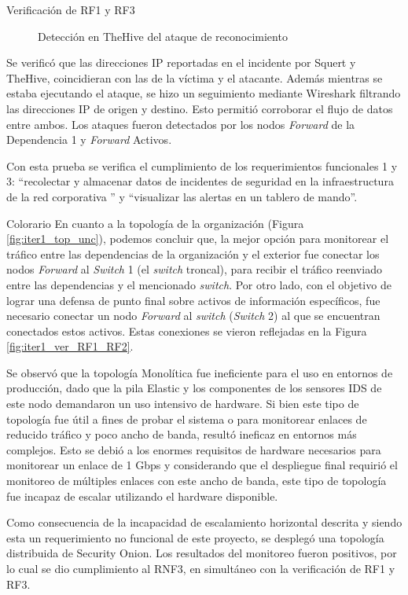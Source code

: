 \begin{section}{Verificación de RF1 y RF3}
\begin{figure}[H]
    \caption{Detección en TheHive del ataque de reconocimiento}
    \label{fig:thehive-nmap}
    \end{figure}
    \FloatBarrier
    Se verificó que las direcciones IP reportadas en el incidente por Squert y TheHive, coincidieran con las de la víctima y el atacante. Además mientras se estaba ejecutando el ataque, se hizo un seguimiento mediante Wireshark \cite{wireshark} filtrando las direcciones IP de origen y destino. Esto permitió corroborar el flujo de datos entre ambos.
    Los ataques fueron detectados por los nodos \textit{Forward} de la Dependencia 1 y \textit{Forward} Activos. \par
    Con esta prueba se verifica el cumplimiento de los requerimientos funcionales 1 y 3: “recolectar y almacenar datos de incidentes de seguridad en la infraestructura de la red corporativa ” y “visualizar las alertas en un tablero de mando”.\par
    \end{section} 
    
    
    \begin{section}{Colorario}
    En cuanto a la topología de la organización (Figura \ref{fig:iter1_top_unc}), podemos concluir que, la mejor opción para monitorear el tráfico entre las dependencias de la organización y el exterior fue conectar los nodos \textit{Forward} al \textit{Switch} 1 (el \textit{switch} troncal), para recibir el tráfico reenviado entre las dependencias y el mencionado \textit{switch}. Por otro lado, con el objetivo de lograr una defensa de punto final sobre activos de información específicos, fue necesario conectar un nodo \textit{Forward} al \textit{switch} (\textit{Switch} 2) al que se encuentran conectados estos activos. Estas conexiones se vieron reflejadas en la Figura \ref{fig:iter1_ver_RF1_RF2}. \par
    Se observó que la topología Monolítica fue ineficiente para el uso en entornos de producción, dado que la pila Elastic y los componentes de los sensores IDS de este nodo demandaron un uso intensivo de hardware. Si bien este tipo de topología fue útil a fines de probar el sistema o para monitorear enlaces de reducido tráfico y poco ancho de banda, resultó ineficaz en entornos más complejos. Esto se debió a los enormes requisitos de hardware necesarios para monitorear un enlace de 1 Gbps y considerando que el despliegue final requirió el monitoreo de múltiples enlaces con este ancho de banda, este tipo de topología fue incapaz de escalar utilizando el hardware disponible.\par
    Como consecuencia de la incapacidad de escalamiento horizontal descrita y siendo esta un requerimiento no funcional de este proyecto, se desplegó una topología distribuida de Security Onion. Los resultados del monitoreo fueron positivos, por lo cual se dio cumplimiento al RNF3, en simultáneo con la verificación de RF1 y RF3.\par
    

    \end{section}